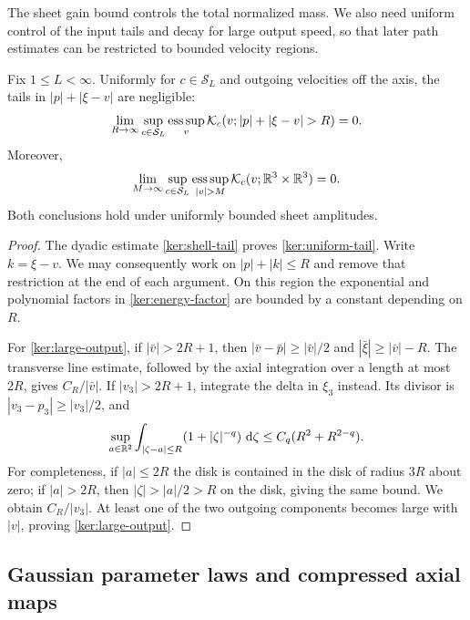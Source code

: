 The sheet gain bound controls the total normalized mass. We also
need uniform control of the input tails and decay for large output
speed, so that later path estimates can be restricted to bounded
velocity regions.

\begin{lemma}
\label{lem:kernel-tightness}
Fix $1\leq L<\infty$. Uniformly for $c\in\mathcal S_L$ and outgoing
velocities off the axis, the tails in $|p|+|\xi-v|$ are negligible:
\begin{equation}\label{ker:uniform-tail}
 \lim_{R\to\infty}\sup_{c\in\mathcal S_L}\esssup_v
 \mathcal K_c(v;|p|+|\xi-v|>R)=0.
\end{equation}
Moreover,
\begin{equation}\label{ker:large-output}
 \lim_{M\to\infty}\sup_{c\in\mathcal S_L}
 \esssup_{|v|>M}\mathcal K_c(v;\R^3\times\R^3)=0.
\end{equation}
Both conclusions hold under uniformly bounded sheet amplitudes.
\end{lemma}

\begin{proof}
The dyadic estimate \eqref{ker:shell-tail} proves
\eqref{ker:uniform-tail}. Write $k=\xi-v$. We may consequently work on
$|p|+|k|\leq R$ and remove that restriction at the end of each
argument. On this region the exponential and polynomial factors in
\eqref{ker:energy-factor} are bounded by a constant depending on $R$.

For \eqref{ker:large-output}, if $|\bar v|>2R+1$, then
$|\bar v-\bar p|\geq|\bar v|/2$ and
$|\bar\xi|\geq|\bar v|-R$. The transverse line estimate, followed
by the axial integration over a length at most $2R$, gives
$C_R/|\bar v|$. If $|v_3|>2R+1$, integrate the delta in $\xi_3$
instead. Its divisor is $|v_3-p_3|\geq|v_3|/2$, and
\begin{equation}\label{ker:disk-singularity}
 \sup_{a\in\mathbb R^2}\int_{|\zeta-a|\leq R}
       (1+|\zeta|^{-q})\,\,\mathrm d\zeta
 \leq C_q(R^2+R^{2-q}).
\end{equation}
For completeness, if $|a|\leq2R$ the disk is contained in the disk
of radius $3R$ about zero; if $|a|>2R$, then $|\zeta|>|a|/2>R$ on
the disk, giving the same bound. We obtain $C_R/|v_3|$. At least one
of the two outgoing components becomes large with $|v|$, proving
\eqref{ker:large-output}.
\end{proof}

\subsection{Gaussian parameter laws and compressed axial maps}

